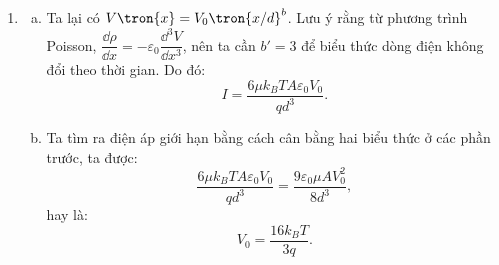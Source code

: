 \begin{loigiai}
\begin{enumerate}[1)]
\begin{enumerate}[a)]
    \end{enumerate}
    \item 
    \begin{enumerate}[a)]
        \item Ta lại có $V\tron{x}=V_0\tron{x/d}^b$. Lưu ý rằng từ phương trình Poisson, $\dfrac{\dd \rho}{\dd x}=-\varepsilon_0\dfrac{\dd^3 V}{\dd x^3}$, nên ta cần $b'=3$ để biểu thức dòng điện không đổi theo thời gian. Do đó:
        $$I=\dfrac{6\mu k_BTA\varepsilon_0V_0}{qd^3}.$$
        \item Ta tìm ra điện áp giới hạn bằng cách cân bằng hai biểu thức ở các phần trước, ta được:
        $$\dfrac{6\mu k_BTA\varepsilon_0V_0}{qd^3}=\dfrac{9\varepsilon_0\mu AV_0^2}{8d^3},$$
        hay là:
        $$V_0=\dfrac{16k_BT}{3q}.$$
    \end{enumerate}
\end{enumerate}
\end{loigiai}



